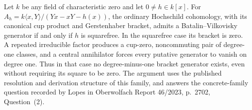 Let \(k\) be any field of characteristic zero and let \(0\ne h\in k[x]\).
For \(A_h=k\langle x,Y\rangle/(Yx-xY-h(x))\), the ordinary Hochschild
cohomology, with its canonical cup product and Gerstenhaber bracket,
admits a Batalin--Vilkovisky generator if and only if \(h\) is squarefree.
In the squarefree case its bracket is zero. A repeated irreducible factor
produces a cup-zero, noncommuting pair of degree-one classes, and a central
annihilator forces every putative generator to vanish on degree one.
Thus in that case no degree-minus-one bracket generator exists, even
without requiring its square to be zero.
The argument uses the published resolution and derivation structure of this
family, and answers the concrete-family question recorded by Lopes in
Oberwolfach Report 46/2023, p.~2702, Question~(2).
